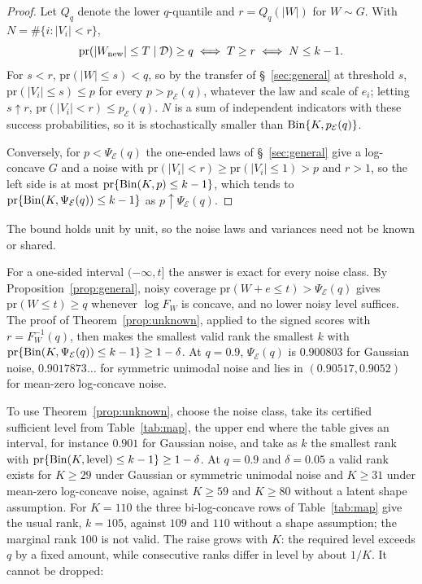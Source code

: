 \documentclass[lineno]{biometrika}
\newcommand{\pr}{\mathrm{pr}}
\begin{document}
\begin{proof}
Let $Q_q$ denote the lower $q$-quantile and $r = Q_q(|W|)$ for $W \sim G$. With $N = \#\{i : |V_i| < r\}$,
\[
\pr(|W_{\rm new}| \le T \mid \mathcal D) \ge q \iff T \ge r \iff N \le k - 1.
\] For $s < r$, $\pr(|W| \le s) < q$, so by the transfer of \S~\ref{sec:general} at threshold $s$, $\pr(|V_i| \le s) \le p$ for every $p > p_{\mathcal E}(q)$, whatever the law and scale of $e_i$; letting $s \uparrow r$, $\pr(|V_i| < r) \le p_{\mathcal E}(q)$. $N$ is a sum of independent indicators with these success probabilities, so it is stochastically smaller than ${\rm Bin}\{K, p_{\mathcal E}(q)\}$.

Conversely, for $p < \Psi_{\mathcal E}(q)$ the one-ended laws of \S~\ref{sec:general} give a log-concave $G$ and a noise with $\pr(|V_i| < r) \ge \pr(|V_i| \le 1) > p$ and $r > 1$, so the left side is at most $\pr\{{\rm Bin}(K, p) \le k - 1\}$, which tends to $\pr\{{\rm Bin}(K, \Psi_{\mathcal E}(q)) \le k - 1\}$ as $p \uparrow \Psi_{\mathcal E}(q)$.
\end{proof}

The bound holds unit by unit, so the noise laws and variances need not be known or shared.

For a one-sided interval $(-\infty, t]$ the answer is exact for every noise class. By Proposition~\ref{prop:general}, noisy coverage $\pr(W + e \le t) > \Psi_{\mathcal E}(q)$ gives $\pr(W \le t) \ge q$ whenever $\log F_W$ is concave, and no lower noisy level suffices. The proof of Theorem~\ref{prop:unknown}, applied to the signed scores with $r = F_W^{-1}(q)$, then makes the smallest valid rank the smallest $k$ with $\pr\{{\rm Bin}(K, \Psi_{\mathcal E}(q)) \le k - 1\} \ge 1 - \delta$. At $q = 0.9$, $\Psi_{\mathcal E}(q)$ is $0.900803$ for Gaussian noise, $0.9017873\ldots$ for symmetric unimodal noise and lies in $(0.90517, 0.9052)$ for mean-zero log-concave noise.

To use Theorem~\ref{prop:unknown}, choose the noise class, take its certified sufficient level from Table~\ref{tab:map}, the upper end where the table gives an interval, for instance $0.901$ for Gaussian noise, and take as $k$ the smallest rank with $\pr\{{\rm Bin}(K, \text{level}) \le k - 1\} \ge 1 - \delta$. At $q = 0.9$ and $\delta = 0.05$ a valid rank exists for $K \ge 29$ under Gaussian or symmetric unimodal noise and $K \ge 31$ under mean-zero log-concave noise, against $K \ge 59$ and $K \ge 80$ without a latent shape assumption. For $K = 110$ the three bi-log-concave rows of Table~\ref{tab:map} give the usual rank, $k = 105$, against $109$ and $110$ without a shape assumption; the marginal rank $100$ is not valid. The raise grows with $K$: the required level exceeds $q$ by a fixed amount, while consecutive ranks differ in level by about $1/K$. It cannot be dropped:
\end{document}
